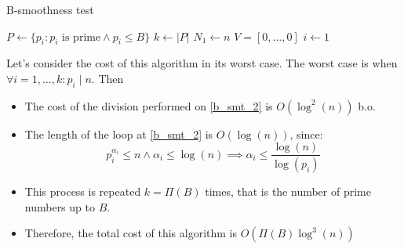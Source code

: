 \begin{algorithm}
\caption{B-smoothness test}\label{alg:b_smoothness_test}
    $P \gets \{p_{i} : p_{i} \text{ is prime} \land p_{i} \leq B\}$\;
    $k \gets |P|$\;
    $N_{1} \gets n$\;
    $V = [0, \dots, 0]$\;
    $i \gets 1$\;
\end{algorithm}
Let's consider the cost of this algorithm in its worst case.\newline
The worst case is when $\forall i = 1, \dots, k: p_{i} \mid n$. Then
\begin{itemize}
    \item The cost of the division performed on \ref{b_smt_2} is $O(\operatorname{log}^{2}(n))$ b.o.
    \item The length of the loop at \ref{b_smt_2} is $O(\operatorname{log}(n))$, since:
    \[p_{i}^{\alpha_{i}} \leq n \land \alpha_{i} \leq \operatorname{log}(n) \implies \alpha_{i} \leq \frac{\operatorname{log}(n)}{\operatorname{log}(p_{i})}\]
    \item This process is repeated $k = \Pi(B)$ times, that is the number of prime numbers up to $B$.
    \item Therefore, the total cost of this algorithm is $O(\Pi(B) \operatorname{log}^{3}(n))$
\end{itemize}
